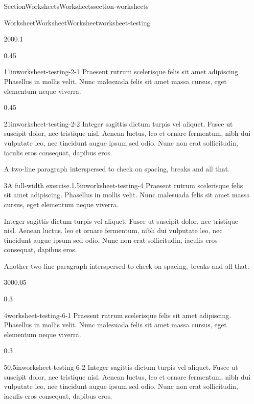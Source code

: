 \documentclass[twoside,10pt,]{article}
\numberwithin{equation}{section}
\begin{document}
\begin{sectionptx}{Section}{Worksheets}{}{Worksheets}{}{}{section-worksheets}
\begin{worksheet-subsection}{Worksheet}{Worksheet}{}{Worksheet}{}{}{worksheet-testing}
\begin{sidebyside}{2}{0}{0}{0.1}
\begin{sbspanel}{0.45}
\begin{divisionexercise}{1}{}{1in}{worksheet-testing-2-1}%
Praesent rutrum scelerisque felis sit amet adipiscing. Phasellus in mollis velit. Nunc malesuada felis sit amet massa cursus, eget elementum neque viverra.%
\end{divisionexercise}%
\end{sbspanel}%
\begin{sbspanel}{0.45}%
\begin{divisionexercise}{2}{}{1in}{worksheet-testing-2-2}%
Integer sagittis dictum turpis vel aliquet. Fusce ut suscipit dolor, nec tristique nisl. Aenean luctus, leo et ornare fermentum, nibh dui vulputate leo, nec tincidunt augue ipsum sed odio. Nunc non erat sollicitudin, iaculis eros consequat, dapibus eros.%
\end{divisionexercise}%
\end{sbspanel}%
\end{sidebyside}%
\par
A two-line paragraph interspersed to check on spacing, breaks and all that.%
\begin{divisionexercise}{3}{A full-width exercise.}{1.5in}{worksheet-testing-4}%
Praesent rutrum scelerisque felis sit amet adipiscing. Phasellus in mollis velit. Nunc malesuada felis sit amet massa cursus, eget elementum neque viverra.%
\par
Integer sagittis dictum turpis vel aliquet. Fusce ut suscipit dolor, nec tristique nisl. Aenean luctus, leo et ornare fermentum, nibh dui vulputate leo, nec tincidunt augue ipsum sed odio. Nunc non erat sollicitudin, iaculis eros consequat, dapibus eros.%
\end{divisionexercise}%
Another two-line paragraph interspersed to check on spacing, breaks and all that.%
\begin{sidebyside}{3}{0}{0}{0.05}%
\begin{sbspanel}{0.3}%
\begin{divisionexercise}{4}{}{}{worksheet-testing-6-1}%
Praesent rutrum scelerisque felis sit amet adipiscing. Phasellus in mollis velit. Nunc malesuada felis sit amet massa cursus, eget elementum neque viverra.%
\end{divisionexercise}%
\end{sbspanel}%
\begin{sbspanel}{0.3}%
\begin{divisionexercise}{5}{}{0.5in}{worksheet-testing-6-2}%
Integer sagittis dictum turpis vel aliquet. Fusce ut suscipit dolor, nec tristique nisl. Aenean luctus, leo et ornare fermentum, nibh dui vulputate leo, nec tincidunt augue ipsum sed odio. Nunc non erat sollicitudin, iaculis eros consequat, dapibus eros.%

\end{divisionexercise}
\end{sbspanel}
\end{sidebyside}
\end{worksheet-subsection}
\end{sectionptx}
\end{document}
